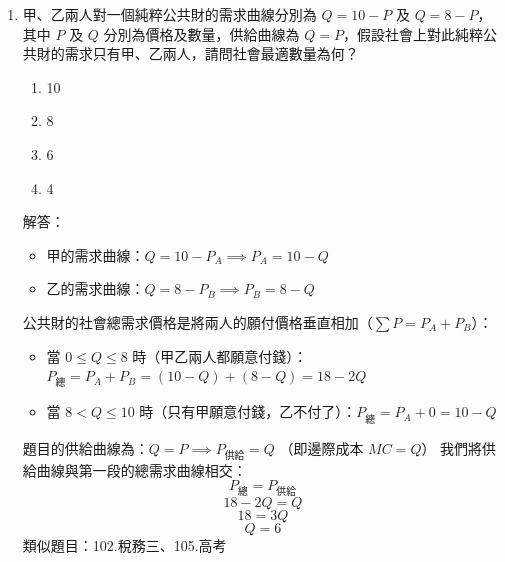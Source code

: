 \documentclass[12pt, a4paper]{article}
\begin{document}
\begin{enumerate}
    \item 甲、乙兩人對一個純粹公共財的需求曲線分別為 \(Q=10-P\) 及 \(Q=8-P\)，其中 \(P\) 及 \(Q\) 分別為價格及數量，供給曲線為 \(Q=P\)，假設社會上對此純粹公共財的需求只有甲、乙兩人，請問社會最適數量為何？
    \begin{enumerate}[label=\Alph*.]
        \item 10
        \item 8
        \item 6
        \item 4
    \end{enumerate}
    解答：
    \begin{itemize}
        \item 甲的需求曲線：\(Q = 10 - P_A \implies P_A = 10 - Q\)
        \item 乙的需求曲線：\(Q = 8 - P_B \implies P_B = 8 - Q\)
    \end{itemize}
    公共財的社會總需求價格是將兩人的願付價格垂直相加（\(\sum P = P_A + P_B\)）：
    \begin{itemize}
        \item 當 \(0 \le Q \le 8\) 時（甲乙兩人都願意付錢）：\(P_{總} = P_A + P_B = (10 - Q) + (8 - Q) = 18 - 2Q\)
        \item 當 \(8 < Q \le 10\) 時（只有甲願意付錢，乙不付了）：\(P_{總} = P_A + 0 = 10 - Q\)
    \end{itemize}
	題目的供給曲線為：\(Q = P \implies P_{供給} = Q\) （即邊際成本 \(MC = Q\)）
    我們將供給曲線與第一段的總需求曲線相交：
    \[
    P_{總} = P_{供給}
    \]
    \[
    18 - 2Q = Q
    \]
    \[
    18 = 3Q
    \]
    \[
    Q = 6
    \]
    類似題目：102.稅務三、105.高考


\end{enumerate}
\end{document}
